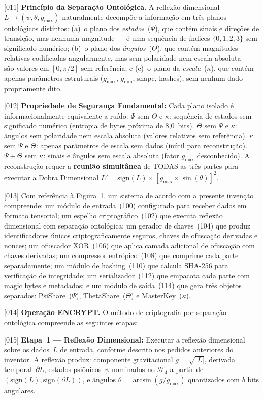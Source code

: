 \documentclass[12pt,a4paper]{article}
\newcommand{\Hfour}{\mathcal{H}_4}
\begin{document}
{[011]} \textbf{Princípio da Separação Ontológica.} A reflexão
dimensional $L \to (\psi, \theta, g_{\max})$ naturalmente
decompõe a informação em três planos ontológicos distintos:
(a)~o plano dos \textit{estados}~($\Psi$), que contém sinais e
direções de transição, mas nenhuma magnitude --- é uma sequência
de índices $\{0,1,2,3\}$ sem significado numérico; (b)~o plano
dos \textit{ângulos}~($\Theta$), que contém magnitudes
relativas codificadas angularmente, mas sem polaridade nem
escala absoluta --- são valores em $[0, \pi/2]$ sem referência;
e (c)~o plano da \textit{escala}~($\kappa$), que contém apenas
parâmetros estruturais ($g_{\max}$, $g_{\min}$, shape, hashes),
sem nenhum dado propriamente dito.

{[012]} \textbf{Propriedade de Segurança Fundamental:} Cada
plano isolado é informacionalmente equivalente a ruído.
$\Psi$ sem $\Theta$ e $\kappa$: sequência de estados sem
significado numérico (entropia de bytes próxima de 8,0~bits).
$\Theta$ sem $\Psi$ e $\kappa$: ângulos sem polaridade nem
escala absoluta (valores relativos sem referência). $\kappa$
sem $\Psi$ e $\Theta$: apenas parâmetros de escala sem dados
(inútil para reconstrução). $\Psi + \Theta$ sem $\kappa$:
sinais e ângulos sem escala absoluta (fator $g_{\max}$
desconhecido). A reconstrução requer a \textbf{reunião
simultânea} de TODAS as três partes para executar a Dobra
Dimensional
$L' = \text{sign}(L) \times [g_{\max} \times \sin(\theta)]^2$.

{[013]} Com referência à Figura~1, um sistema de acordo com a
presente invenção compreende: um módulo de entrada~(100)
configurado para receber dados em formato tensorial; um espelho
criptográfico~(102) que executa reflexão dimensional com
separação ontológica; um gerador de chaves~(104) que produz
identificadores únicos criptograficamente seguros, chaves de
ofuscação derivadas e nonces; um ofuscador XOR~(106) que aplica
camada adicional de ofuscação com chaves derivadas; um
compressor entrópico~(108) que comprime cada parte
separadamente; um módulo de hashing~(110) que calcula SHA-256
para verificação de integridade; um serializador~(112) que
empacota cada parte com magic bytes e metadados; e um módulo de
saída~(114) que gera três objetos separados: PsiShare~($\Psi$),
ThetaShare~($\Theta$) e MasterKey~($\kappa$).

{[014]} \textbf{Operação ENCRYPT.} O método de criptografia por
separação ontológica compreende as seguintes etapas:

{[015]} \textbf{Etapa~1 --- Reflexão Dimensional:} Executar a
reflexão dimensional sobre os dados~$L$ de entrada, conforme
descrito nos pedidos anteriores do inventor. A reflexão produz:
componente gravitacional $g = \sqrt{|L|}$, derivada
temporal~$\partial L$, estados psiônicos~$\psi$ nominados no
$\Hfour$ a partir de $(\text{sign}(L), \text{sign}(\partial L))$,
e ângulos $\theta = \arcsin(g/g_{\max})$ quantizados com $b$
bits angulares.
\end{document}

